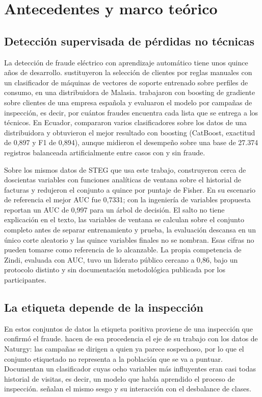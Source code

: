 \section{Antecedentes y marco teórico}\label{sec:marco}

\subsection{Detección supervisada de pérdidas no técnicas}

La detección de fraude eléctrico con aprendizaje automático tiene unos quince años de
desarrollo. \textcite{nagi2010} sustituyeron la selección de clientes por reglas manuales con
un clasificador de máquinas de vectores de soporte entrenado sobre perfiles de consumo, en
una distribuidora de Malasia. \textcite{comapuig2016} trabajaron con boosting de gradiente
sobre clientes de una empresa española y evaluaron el modelo por campañas de inspección, es
decir, por cuántos fraudes encuentra cada lista que se entrega a los técnicos. En Ecuador,
\textcite{ariasmarin2025} compararon varios clasificadores sobre los datos de una
distribuidora y obtuvieron el mejor resultado con boosting (CatBoost, exactitud de 0,897 y
F1 de 0,894), aunque midieron el desempeño sobre una base de 27.374 registros balanceada
artificialmente entre casos con y sin fraude.

Sobre los mismos datos de STEG que usa este trabajo, \textcite{oprea2022} construyeron
cerca de doscientas variables con funciones analíticas de ventana sobre el historial de
facturas y redujeron el conjunto a quince por puntaje de Fisher. En su escenario de
referencia el mejor AUC fue 0,7331; con la ingeniería de variables propuesta reportan un
AUC de 0,997 para un árbol de decisión. El salto no tiene explicación en el texto, las
variables de ventana se calculan sobre el conjunto completo antes de separar entrenamiento y
prueba, la evaluación descansa en un único corte aleatorio y las quince variables finales no
se nombran. Esas cifras no pueden tomarse como referencia de lo alcanzable. La propia
competencia de Zindi, evaluada con AUC, tuvo un liderato público cercano a 0,86, bajo un
protocolo distinto y sin documentación metodológica publicada por los participantes.

\subsection{La etiqueta depende de la inspección}

En estos conjuntos de datos la etiqueta positiva proviene de una inspección que confirmó el
fraude. \textcite{comapuig2022} hacen de esa procedencia el eje de su trabajo con los datos
de Naturgy: las campañas se dirigen a quien ya parece sospechoso, por lo que el conjunto
etiquetado no representa a la población que se va a puntuar. Documentan un clasificador cuyas
ocho variables más influyentes eran casi todas historial de visitas, es decir, un modelo que
había aprendido el proceso de inspección. \textcite{glauner2016} señalan el mismo sesgo y su
interacción con el desbalance de clases.

